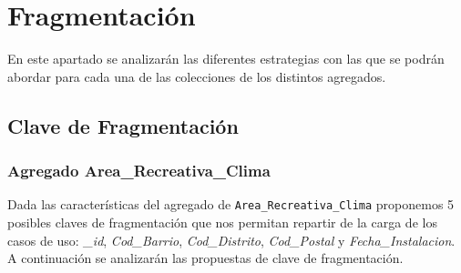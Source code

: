 \documentclass[]{article}
\begin{document}
\section{Fragmentación}
\label{sec:fragmentacion}
En este apartado se analizarán las diferentes estrategias con las que se podrán abordar para cada una de las colecciones de los distintos agregados.

\subsection{Clave de Fragmentación}
\label{subsec:fragmmentacion}

\subsubsection{Agregado Area\_Recreativa\_Clima}
\label{subsubsec:fragmentacion_area}
Dada las características del agregado de \texttt{Area\_Recreativa\_Clima} proponemos 5 posibles claves de fragmentación que nos permitan repartir de la carga de los casos de uso: \textit{\_id}, \textit{Cod\_Barrio}, \textit{Cod\_Distrito}, \textit{Cod\_Postal} y \textit{Fecha\_Instalacion}. A continuación se analizarán las propuestas de clave de fragmentación.
\end{document}
